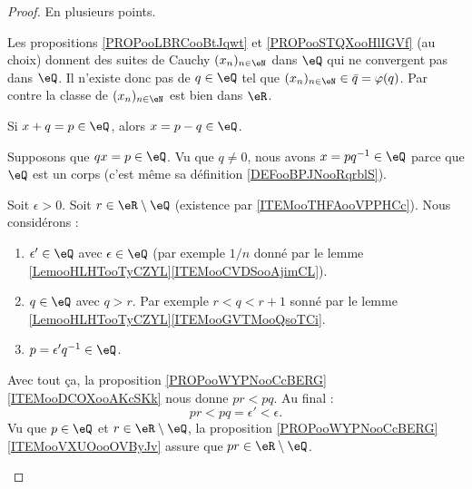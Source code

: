 \begin{proof}
	En plusieurs points.
	\begin{subproof}
		Les propositions \ref{PROPooLBRCooBtJqwt} et \ref{PROPooSTQXooHlIGVf} (au choix) donnent des suites de Cauchy \( (x_n)_{n\in \eN}\) dans \( \eQ\) qui ne convergent pas dans \( \eQ\). Il n'existe donc pas de \( q\in \eQ\) tel que \( (x_n)_{n\in \eN}\in \bar q=\varphi(q)\). Par contre la classe de \( (x_n)_{n\in \eN}\) est bien dans \( \eR\).

		Si \( x+q=p\in \eQ\), alors \( x=p-q\in \eQ\).

		Supposons que \( qx = p\in \eQ\). Vu que \( q\neq 0\), nous avons \( x=pq^{-1}\in \eQ\) parce que \( \eQ\) est un corps (c'est même sa définition \ref{DEFooBPJNooRqrblS}).

		Soit \( \epsilon>0\). Soit \( r\in \eR\setminus \eQ\) (existence par \ref{ITEMooTHFAooVPPHCc}). Nous considérons :
		\begin{enumerate}
			\item
			      \( \epsilon'\in \eQ\) avec \( \epsilon\in \eQ\) (par exemple \( 1/n\) donné par le lemme \ref{LemooHLHTooTyCZYL}\ref{ITEMooCVDSooAjimCL}).
			\item
			      \( q\in \eQ\) avec \( q>r\). Par exemple \( r<q<r+1\) sonné par le lemme \ref{LemooHLHTooTyCZYL}\ref{ITEMooGVTMooQsoTCi}.
			\item
			      \( p=\epsilon' q^{-1}\in \eQ\).
		\end{enumerate}
		Avec tout ça, la proposition \ref{PROPooWYPNooCcBERG}\ref{ITEMooDCOXooAKcSKk} nous donne \( pr<pq\). Au final :
		\begin{equation}
			pr<pq=\epsilon'<\epsilon.
		\end{equation}
		Vu que \( p\in \eQ\) et \( r\in \eR\setminus \eQ\), la proposition \ref{PROPooWYPNooCcBERG}\ref{ITEMooVXUOooOVByJv} assure que \( pr\in \eR\setminus\eQ\).
	\end{subproof}
\end{proof}

